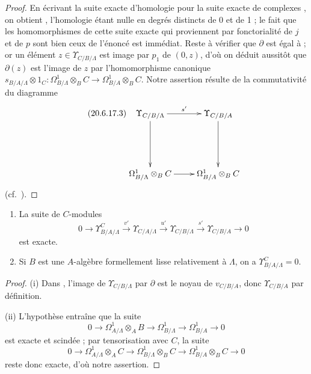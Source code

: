 \begin{proof}
En écrivant la suite exacte d'homologie pour la suite exacte de complexes
, on obtient , l'homologie étant
nulle en degrés distincts de 0 et de 1 ; le fait que les homomorphismes de
cette suite exacte qui proviennent par fonctorialité de $j$ et de $p$ sont
bien ceux de l'énoncé est immédiat. Reste à vérifier que $\partial$ est égal
à  ; or un élément $z\in\Upsilon_{C/B/\Lambda}$ est
image par $p_1$ de $(0,z)$, d'où on déduit aussitôt que $\partial(z)$ est
l'image de $z$ par l'homomorphisme canonique
$s_{B/A/\Lambda}\otimes1_C:\Omega^1_{B/\Lambda}\otimes_B C\to\Omega^1_{B/A}\otimes_B C$. Notre assertion résulte de la commutativité du diagramme
\begin{equation}
\tag{20.6.17.3}
\label{0.20.6.17.3-fr}
\xymatrix{
  \Upsilon_{C/B/\Lambda} \ar[r]^{s'} \ar[dd] & \Upsilon_{C/B/A} \ar[dd] \\
  & \\
  \Omega^1_{B/\Lambda}\otimes_B C \ar[r] &
  \Omega^1_{B/A}\otimes_B C
}
\end{equation}
(cf.\ ).
\end{proof}

\begin{corollary}[20.6.18]
\label{0.20.6.18-fr}
\begin{enumerate}
  \item[\rm(i)] La suite de $C$-modules
\begin{equation}
\tag{20.6.18.1}
\label{0.20.6.18.1-fr}
  0\to\Upsilon^C_{B/A/\Lambda}\xrightarrow{v'}
  \Upsilon_{C/A/\Lambda}\xrightarrow{u'}
  \Upsilon_{C/B/\Lambda}\xrightarrow{s'}\Upsilon_{C/B/A}\to0
\end{equation}
est exacte.
  \item[\rm(ii)] Si $B$ est une $A$-algèbre formellement lisse relativement
  à $\Lambda$, on a $\Upsilon^C_{B/A/\Lambda}=0$.
\end{enumerate}
\end{corollary}

\begin{proof}
(i) Dans , l'image de $\Upsilon_{C/B/\Lambda}$ par
$\partial$ est le noyau de $v_{C/B/A}$, donc $\Upsilon_{C/B/A}$ par
définition.

(ii) L'hypothèse entraîne que la suite
\[
  0\to\Omega^1_{A/\Lambda}\otimes_A B\to
  \Omega^1_{B/\Lambda}\to\Omega^1_{B/A}\to0
\]
est exacte et scindée  ; par tensorisation avec $C$, la
suite
\[
  0\to\Omega^1_{A/\Lambda}\otimes_A C\to
  \Omega^1_{B/\Lambda}\otimes_B C\to
  \Omega^1_{B/A}\otimes_B C\to0
\]
reste donc exacte, d'où notre assertion.
\end{proof}


